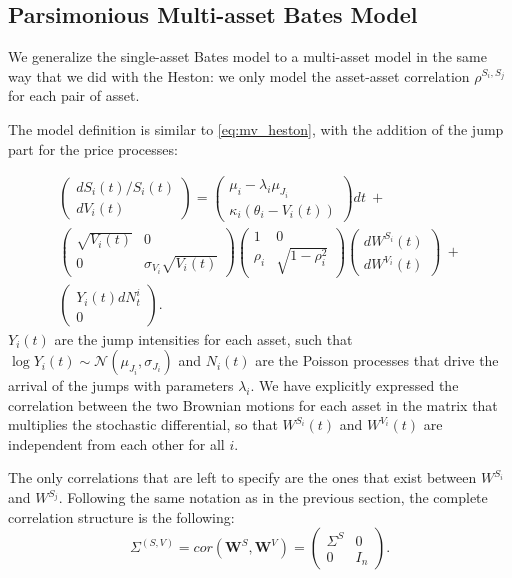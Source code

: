 \subsection{Parsimonious Multi-asset Bates Model}
We  generalize the single-asset Bates model to a multi-asset model in the same way that we did with the Heston: we only model the asset-asset correlation $\rho^{S_i, S_j}$ for each pair of asset.

The model definition  is similar to \eqref{eq:mv_heston}, with the addition of the jump part for the price processes:

\begin{multline}
\begin{pmatrix}
dS_i(t) / S_i(t)\\
dV_i(t)
\end{pmatrix}
= \begin{pmatrix}
\mu_i - \lambda_i \mu_{J_i}\\
\kappa_i (\theta_i - V_i(t))
\end{pmatrix}
dt  \:+\\ 
\begin{pmatrix}
\sqrt{V_i(t)} & 0 \\
0 & \sigma_{V_i} \sqrt{V_i(t)} 
\end{pmatrix}
\begin{pmatrix}
1 & 0 \\
\rho_i & \sqrt{1-\rho_i^2} 
\end{pmatrix}
\begin{pmatrix}
dW^{S_i}(t)\\
dW^{V_i }(t)
\end{pmatrix}
\: + \\
\begin{pmatrix}
Y_i(t) dN^i_t  \\
0   
\end{pmatrix}.
\end{multline}
\noindent
$Y_i(t)$ are the jump intensities for each asset, such that $\log Y_i(t) \sim \mathcal{N}(\mu_{J_i}, \sigma_{J_i})$ and $N_i(t)$ are the Poisson processes that drive the arrival of the jumps with parameters $\lambda_i$.
We have explicitly expressed the correlation between the two Brownian motions for each asset in the matrix that multiplies the stochastic differential, so that $W^{S_i}(t)$ and $W^{V_i}(t)$ are independent from each other for all $i$.

The only correlations that are left to specify are the ones that exist between $W^{S_i}$ and $W^{S_j}$. Following the same notation as in the previous section, the complete correlation structure is the following:
\begin{equation}
\label{eq:bates_cor}
\Sigma^{(S,V)} = cor(\boldsymbol{W}^{S}, \boldsymbol{W}^{V}) = \begin{pmatrix}
\Sigma^{S} & 0 \\
0& I_n
\end{pmatrix}.
\end{equation}


